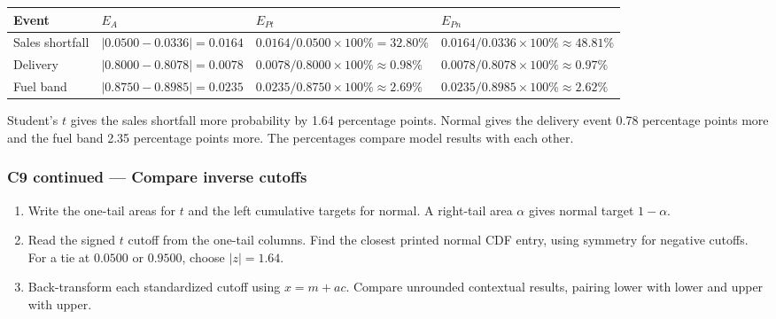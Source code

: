 {\small
\begin{tabularx}{\linewidth}{@{}l l YY@{}}
\toprule
\textbf{Event} & \textbf{\(E_A\)} & \textbf{\(E_{Pt}\)} & \textbf{\(E_{Pn}\)}\\
\midrule
Sales shortfall & \(|0.0500-0.0336|=0.0164\) & \(0.0164/0.0500\times100\%=32.80\%\) & \(0.0164/0.0336\times100\%\approx48.81\%\)\\
Delivery & \(|0.8000-0.8078|=0.0078\) & \(0.0078/0.8000\times100\%\approx0.98\%\) & \(0.0078/0.8078\times100\%\approx0.97\%\)\\
Fuel band & \(|0.8750-0.8985|=0.0235\) & \(0.0235/0.8750\times100\%\approx2.69\%\) & \(0.0235/0.8985\times100\%\approx2.62\%\)\\
\bottomrule
\end{tabularx}
}
\par\smallskip Student's \(t\) gives the sales shortfall more probability by 1.64 percentage points. Normal gives the delivery event 0.78 percentage points more and the fuel band 2.35 percentage points more. The percentages compare model results with each other.

\clearpage
\enlargethispage{12pt}
\subsubsection*{C9 continued --- Compare inverse cutoffs}
\begin{enumerate}
  \item Write the one-tail areas for \(t\) and the left cumulative targets for normal. A right-tail area \(\alpha\) gives normal target \(1-\alpha\).
  \item Read the signed \(t\) cutoff from the one-tail columns. Find the closest printed normal CDF entry, using symmetry for negative cutoffs. For a tie at \(0.0500\) or \(0.9500\), choose \(|z|=1.64\).
  \item Back-transform each standardized cutoff using \(x=m+ac\). Compare unrounded contextual results, pairing lower with lower and upper with upper. 
\end{enumerate}

